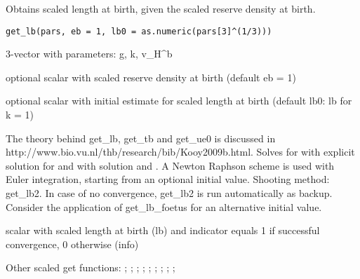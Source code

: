 \documentclass[a4paper]{book}
\begin{document}
%
\begin{Description}\relax
Obtains scaled length at birth, given the scaled reserve density at birth.
\end{Description}
%
\begin{Usage}
\begin{verbatim}
get_lb(pars, eb = 1, lb0 = as.numeric(pars[3]^(1/3)))
\end{verbatim}
\end{Usage}
%
\begin{Arguments}
\begin{ldescription}
\item[\code{pars}] 3-vector with parameters: g, k, v\_H\textasciicircum{}b

\item[\code{eb}] optional scalar with scaled reserve density at birth (default eb = 1)

\item[\code{lb0}] optional scalar with initial estimate for scaled length at birth (default lb0: lb for k = 1)
\end{ldescription}
\end{Arguments}
%
\begin{Details}\relax
The theory behind get\_lb, get\_tb and get\_ue0 is discussed in http://www.bio.vu.nl/thb/research/bib/Kooy2009b.html.
Solves   for  with explicit solution for 
and 
with solution 
and .
A Newton Raphson scheme is used with Euler integration, starting from an optional initial value.
Shooting method: get\_lb2.
In case of no convergence, get\_lb2 is run automatically as backup.
Consider the application of get\_lb\_foetus for an alternative initial value.
\end{Details}
%
\begin{Value}
scalar with scaled length at birth (lb) and indicator equals 1 if successful convergence, 0 otherwise (info)
\end{Value}
%
\begin{SeeAlso}\relax
Other scaled get functions: ;
; ;
; ;
; ;
;
;
\end{SeeAlso}
\end{document}
